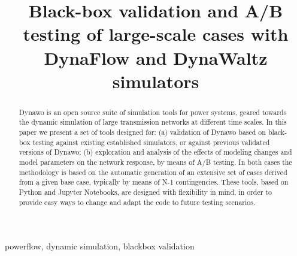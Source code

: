 \documentclass[conference]{IEEEtran}
\begin{document}
\title{Black-box validation and A/B testing of large-scale cases with DynaFlow
  and DynaWaltz simulators}


\author{
}

\maketitle

\begin{abstract}
  Dynawo is an open source suite of simulation tools for power systems, geared
  towards the dynamic simulation of large transmission networks at different
  time scales. In this paper we present a set of tools designed for: (a)
  validation of Dynawo based on black-box testing against existing established
  simulators, or against previous validated versions of Dynawo; (b) exploration
  and analysis of the effects of modeling changes and model parameters on the
  network response, by means of A/B testing. In both cases the methodology is
  based on the automatic generation of an extensive set of cases derived from a
  given base case, typically by means of N-1 contingencies. These tools, based
  on Python and Jupyter Notebooks, are designed with flexibility in mind, in
  order to provide easy ways to change and adapt the code to future testing
  scenarios.
\end{abstract}

\begin{IEEEkeywords}
  powerflow, dynamic simulation, blackbox validation
\end{IEEEkeywords}
\end{document}
